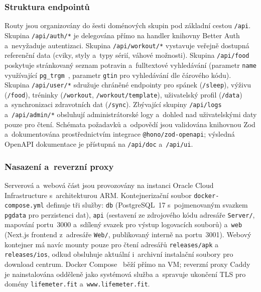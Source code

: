 \subsubsection{Struktura endpointů}

Routy jsou organizovány do šesti doménových skupin pod základní cestou
\texttt{/api}. Skupina \texttt{/api/auth/*} je delegována přímo
na handler knihovny Better Auth a~nevyžaduje autentizaci. Skupina
\texttt{/api/workout/*} vystavuje veřejně dostupná referenční data
(cviky, styly a~typy sérií, váhové možnosti). Skupina
\texttt{/api/food} poskytuje stránkovaný seznam potravin a~fulltextové
vyhledávání (parametr \texttt{name} využívající \texttt{pg\_trgm}\allowbreak\ \cite{pg_trgm2024},
parametr \texttt{gtin} pro vyhledávání dle čárového kódu). Skupina
\texttt{/api/user/*} sdružuje chráněné endpointy pro spánek
(\texttt{/sleep}), výživu (\texttt{/food}), tréninky
(\texttt{/workout}, \texttt{/workout/template}), uživatelský profil
(\texttt{/data}) a~synchronizaci zdravotních dat (\texttt{/sync}).
Zbývající skupiny \texttt{/api/logs} a~\texttt{/api/admin/*} obsluhují
administrátorské logy a~dohled nad uživatelskými daty pouze pro čtení.
Schémata požadavků a~odpovědí jsou validována knihovnou Zod a~dokumentována
prostřednictvím integrace \texttt{@hono/zod-openapi}; výsledná OpenAPI
dokumentace je přístupná na \texttt{/api/doc} a~\texttt{/api/ui}.

\subsubsection{Nasazení a~reverzní proxy}

Serverová a~webová část jsou provozovány na instanci Oracle Cloud
Infrastructure s~architekturou ARM. Kontejnerizační soubor
\texttt{docker-\allowbreak compose.yml} definuje tři služby:
\texttt{db} (PostgreSQL~17 s~pojmenovaným svazkem \texttt{pgdata} pro
perzistenci dat), \texttt{api} (sestavení ze zdrojového kódu adresáře
\texttt{Server/}, mapování portu~3000 a~sdílený svazek pro výstup
logovacích souborů) a~\texttt{web} (Next.js frontend z~adresáře
\texttt{Web/}, publikovaný interně na portu~3001). Webový kontejner
má navíc mounty pouze pro čtení adresářů \texttt{releases/apk} a~
\texttt{releases/ios}, odkud obsluhuje aktuální i~archivní instalační
soubory pro download centrum. Docker Compose~\cite{docker2024} běží přímo
na VM; reverzní proxy Caddy je nainstalována odděleně jako systémová služba
a~spravuje ukončení TLS pro domény \texttt{lifemeter.fit}
a~\texttt{www.lifemeter.fit}.

